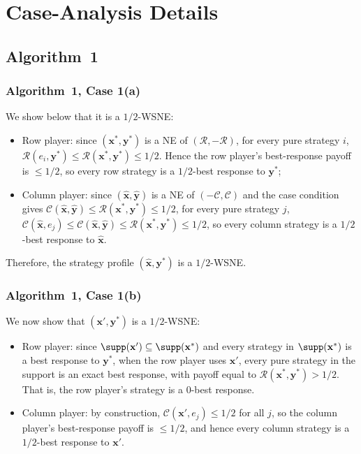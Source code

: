 \section{Case-Analysis Details}
\label{app:case-analysis-details}

\subsection{Algorithm~1}
\label{app:case-analysis-details-algo-1}

\subsubsection{Algorithm~1, Case 1(a)}
\label{app:case-one-low}

We show below that it is a \(1/2\)-WSNE:

\begin{itemize}
  \item Row player: since \((\mathbf{x}^*, \mathbf{y}^*)\) is a NE of \((\mathcal{R}, -\mathcal{R})\), for every pure strategy \(i\), \(\mathcal{R}(e_i, \mathbf{y}^*) \le \mathcal{R}(\mathbf{x}^*, \mathbf{y}^*) \le 1/2\). Hence the row player's best-response payoff is \(\le 1/2\), so every row strategy is a \(1/2\)-best response to \(\mathbf{y}^*\);
  \item Column player: since \((\hat{\mathbf{x}}, \hat{\mathbf{y}})\) is a NE of \((-\mathcal{C}, \mathcal{C})\) and the case condition gives \(\mathcal{C}(\hat{\mathbf{x}}, \hat{\mathbf{y}}) \le \mathcal{R}(\mathbf{x}^*, \mathbf{y}^*) \le 1/2\), for every pure strategy \(j\), \(\mathcal{C}(\hat{\mathbf{x}}, e_j) \le \mathcal{C}(\hat{\mathbf{x}}, \hat{\mathbf{y}}) \le \mathcal{R}(\mathbf{x}^*, \mathbf{y}^*) \le 1/2\), so every column strategy is a \(1/2\)-best response to \(\hat{\mathbf{x}}\).
\end{itemize}

Therefore, the strategy profile \((\hat{\mathbf{x}}, \mathbf{y}^*)\) is a \(1/2\)-WSNE.

\subsubsection{Algorithm~1, Case 1(b)}
\label{app:case-one-low-high}

We now show that \((\mathbf{x}', \mathbf{y}^*)\) is a \(1/2\)-WSNE:

\begin{itemize}
  \item Row player: since \(\supp(\mathbf{x}') \subseteq \supp(\mathbf{x}^*)\) and every strategy in \(\supp(\mathbf{x}^*)\) is a best response to \(\mathbf{y}^*\), when the row player uses \(\mathbf{x}'\), every pure strategy in the support is an exact best response, with payoff equal to \(\mathcal{R}(\mathbf{x}^*, \mathbf{y}^*) > 1/2\). That is, the row player's strategy is a \(0\)-best response.
  \item Column player: by construction, \(\mathcal{C}(\mathbf{x}', e_j) \le 1/2\) for all \(j\), so the column player's best-response payoff is \(\le 1/2\), and hence every column strategy is a \(1/2\)-best response to \(\mathbf{x}'\).
\end{itemize}

